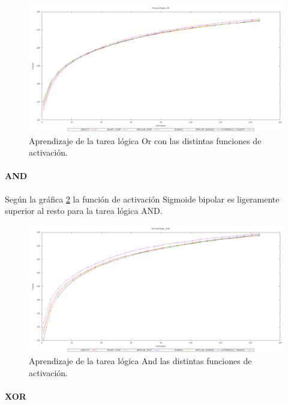 \documentclass[11pt]{article}
\begin{document}
\begin{titlepage}
\begin{figure}[htb]
\centering
\includegraphics[width=\textwidth]{./img/FunctionTypes_OR.png}
\caption{\label{aprenFuncOr}Aprendizaje de la tarea lógica Or con las distintas funciones de activación.}
\end{figure}

\newpage
\paragraph{AND}
\label{sec-6-2-1-2}


Según la gráfica \ref{aprenFuncAnd} la función de activación Sigmoide bipolar es ligeramente superior al resto para la tarea lógica AND.

\begin{figure}[htb]
\centering
\includegraphics[width=\textwidth]{./img/FunctionTypes_AND.png}
\caption{\label{aprenFuncAnd}Aprendizaje de la tarea lógica And las distintas funciones de activación.}
\end{figure}

\newpage
\paragraph{XOR}
\label{sec-6-2-1-3}



\end{titlepage}
\end{document}
